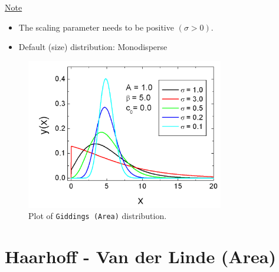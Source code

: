 \uline{Note}
\begin{itemize}
  \item The scaling parameter needs to be positive $(\sigma > 0)$.
  \item Default (size) distribution: Monodisperse
\end{itemize}

\begin{figure}[htb]
\begin{center}
\includegraphics[width=0.768\textwidth]{GiddingsArea.png}
\end{center}
\caption{Plot of \texttt{Giddings (Area)} distribution.}
\label{fig:GiddingsArea}
\end{figure}

\clearpage
\section{Haarhoff - Van der Linde (Area)} ~\\
\label{sec:HaarhoffVanderLindeArea}

